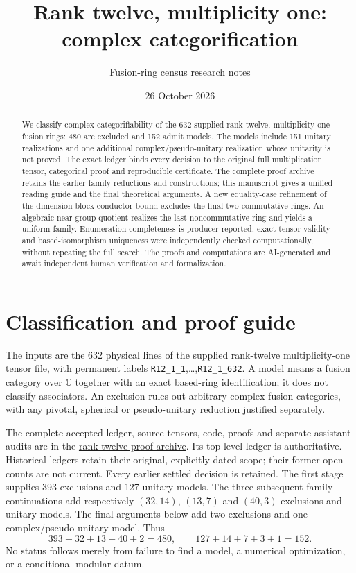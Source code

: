 \documentclass[11pt]{article}
\title{Rank twelve, multiplicity one:\\complex categorification}
\author{Fusion-ring census research notes}
\date{26 October 2026}
\begin{document}
\maketitle
\begin{abstract}
We classify complex categorifiability of the 632 supplied rank-twelve,
multiplicity-one fusion rings: 480 are excluded and 152 admit models.
The models include 151 unitary realizations and one additional
complex/pseudo-unitary realization whose unitarity is not proved.
The exact ledger binds every decision to the original full multiplication
tensor, categorical proof and reproducible certificate. The complete
proof archive retains the earlier family reductions and constructions;
this manuscript gives a unified reading guide and the final theoretical
arguments. A new equality-case refinement of the dimension-block conductor
bound excludes the final two commutative rings. An algebraic near-group
quotient realizes the last noncommutative ring and yields a uniform family.
Enumeration completeness is producer-reported; exact tensor validity and
based-isomorphism uniqueness were independently checked computationally,
without repeating the full search. The proofs and computations are
AI-generated and await independent human verification and formalization.
\end{abstract}

\section*{Classification and proof guide}
The inputs are the 632 physical lines of the supplied rank-twelve
multiplicity-one tensor file, with permanent labels
\texttt{R12\_1\_1},\ldots,\texttt{R12\_1\_632}.
A model means a fusion category over $\mathbb C$ together with an exact
based-ring identification; it does not classify associators.
An exclusion rules out arbitrary complex fusion categories, with any
pivotal, spherical or pseudo-unitary reduction justified separately.

The complete accepted ledger, source tensors, code, proofs and separate
assistant audits are in the
\href{https://github.com/sebastienpalcoux/grothendieck-ring-classification/tree/main/evidence/rank12_m1_20261026}{rank-twelve proof archive}.
Its top-level ledger is authoritative. Historical ledgers retain their
original, explicitly dated scope; their former open counts are not current.
Every earlier settled decision is retained. The first stage supplies
393 exclusions and 127 unitary models. The three subsequent family
continuations add respectively $(32,14)$, $(13,7)$ and $(40,3)$
exclusions and unitary models. The final arguments below add two
exclusions and one complex/pseudo-unitary model. Thus
\[
393+32+13+40+2=480,\qquad 127+14+7+3+1=152.
\]
No status follows merely from failure to find a model, a numerical
optimization, or a conditional modular datum.
\end{document}
